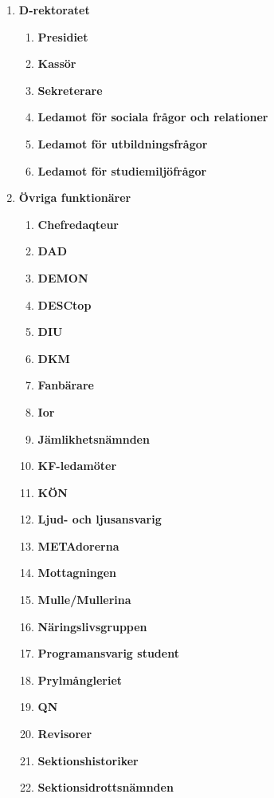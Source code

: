 \documentclass{dagordning}
\begin{document}
  \begin{enumerate}
    \item \textbf{D-rektoratet}
      \begin{enumerate}
        \item \textbf{Presidiet}
        \item \textbf{Kassör}
        \item \textbf{Sekreterare}
        \item \textbf{Ledamot för sociala frågor och relationer}
        \item \textbf{Ledamot för utbildningsfrågor}
        \item \textbf{Ledamot för studiemiljöfrågor}
      \end{enumerate}
    \item \textbf{Övriga funktionärer}
      \begin{enumerate}
      	\item \textbf{Chefredaqteur}
      	\item \textbf{DAD}
        \item \textbf{DEMON}
        \item \textbf{DESCtop}
        \item \textbf{DIU}
        \item \textbf{DKM}
        \item \textbf{Fanbärare}
        \item \textbf{Ior}
        \item \textbf{Jämlikhetsnämnden}
        \item \textbf{KF-ledamöter}
        \item \textbf{KÖN}
        \item \textbf{Ljud- och ljusansvarig}
        \item \textbf{METAdorerna}
        \item \textbf{Mottagningen}
        \item \textbf{Mulle/Mullerina}
        \item \textbf{Näringslivsgruppen}
        \item \textbf{Programansvarig student}
        \item \textbf{Prylmångleriet}
        \item \textbf{QN}
        \item \textbf{Revisorer}
        \item \textbf{Sektionshistoriker}
        \item \textbf{Sektionsidrottsnämnden}

\end{enumerate}
\end{enumerate}
\end{document}
